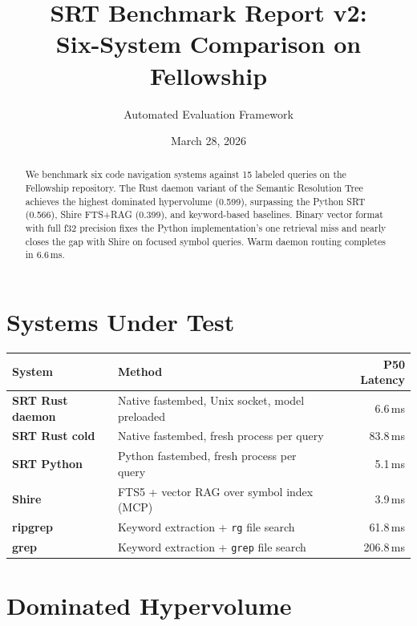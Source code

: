 \documentclass[11pt,a4paper]{article}
\title{\textbf{SRT Benchmark Report v2:\\Six-System Comparison on Fellowship}}
\author{Automated Evaluation Framework}
\date{March 28, 2026}
\begin{document}
\maketitle

\begin{abstract}
We benchmark six code navigation systems against 15 labeled queries on the Fellowship repository.
The Rust daemon variant of the Semantic Resolution Tree achieves the highest dominated hypervolume (0.599), surpassing the Python SRT (0.566), Shire FTS+RAG (0.399), and keyword-based baselines.
Binary vector format with full f32 precision fixes the Python implementation's one retrieval miss and nearly closes the gap with Shire on focused symbol queries.
Warm daemon routing completes in 6.6\,ms.
\end{abstract}

\section{Systems Under Test}

\begin{table}[h]
\centering
\footnotesize
\begin{tabular}{llr}
\toprule
\textbf{System} & \textbf{Method} & \textbf{P50 Latency} \\
\midrule
\textcolor{rustdaemon}{\textbf{SRT Rust daemon}} & Native fastembed, Unix socket, model preloaded & 6.6\,ms \\
\textcolor{rustcold}{\textbf{SRT Rust cold}} & Native fastembed, fresh process per query & 83.8\,ms \\
\textcolor{srtpython}{\textbf{SRT Python}} & Python fastembed, fresh process per query & 5.1\,ms \\
\textcolor{shirered}{\textbf{Shire}} & FTS5 + vector RAG over symbol index (MCP) & 3.9\,ms \\
\textcolor{rgorange}{\textbf{ripgrep}} & Keyword extraction + \texttt{rg} file search & 61.8\,ms \\
\textcolor{grepgray}{\textbf{grep}} & Keyword extraction + \texttt{grep} file search & 206.8\,ms \\
\bottomrule
\end{tabular}
\end{table}

\section{Dominated Hypervolume}
\end{document}
